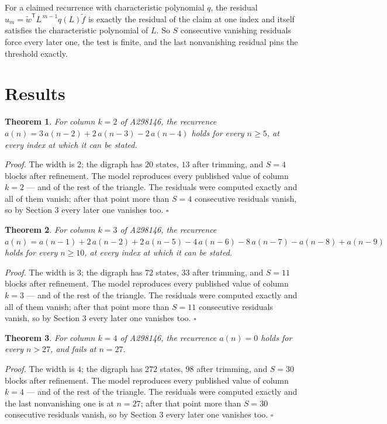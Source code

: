 \documentclass[11pt]{article}
\newtheorem{theorem}{Theorem}
\theoremstyle{definition}
\begin{document}
For a claimed recurrence with characteristic polynomial $q$, the residual $u_m = \tilde w^{\mathsf T}L^{\,m-1}q(L)\tilde f$ is exactly the residual of the claim at one index and itself satisfies the characteristic polynomial of $L$. So $S$ consecutive vanishing residuals force every later one, the test is finite, and the last nonvanishing residual pins the threshold exactly.

\section{Results}

\begin{theorem} For column $k = 2$ of A298146, the recurrence $a(n) = 3\,a(n-2) + 2\,a(n-3) - 2\,a(n-4)$ holds for every $n \ge 5$, at every index at which it can be stated.\end{theorem}

{\itshape Proof.} The width is $2$; the digraph has $20$ states, $13$ after trimming, and $S = 4$ blocks after refinement. The model reproduces every published value of column $k = 2$ --- and of the rest of the triangle. The residuals were computed exactly and all of them vanish; after that point more than $S = 4$ consecutive residuals vanish, so by Section 3 every later one vanishes too. $\square$

\begin{theorem} For column $k = 3$ of A298146, the recurrence $a(n) = a(n-1) + 2\,a(n-2) + 2\,a(n-5) - 4\,a(n-6) - 8\,a(n-7) - a(n-8) + a(n-9)$ holds for every $n \ge 10$, at every index at which it can be stated.\end{theorem}

{\itshape Proof.} The width is $3$; the digraph has $72$ states, $33$ after trimming, and $S = 11$ blocks after refinement. The model reproduces every published value of column $k = 3$ --- and of the rest of the triangle. The residuals were computed exactly and all of them vanish; after that point more than $S = 11$ consecutive residuals vanish, so by Section 3 every later one vanishes too. $\square$

\begin{theorem} For column $k = 4$ of A298146, the recurrence $a(n) = 0$ holds for every $n > 27$, and fails at $n = 27$.\end{theorem}

{\itshape Proof.} The width is $4$; the digraph has $272$ states, $98$ after trimming, and $S = 30$ blocks after refinement. The model reproduces every published value of column $k = 4$ --- and of the rest of the triangle. The residuals were computed exactly and the last nonvanishing one is at $n = 27$; after that point more than $S = 30$ consecutive residuals vanish, so by Section 3 every later one vanishes too. $\square$
\end{document}
